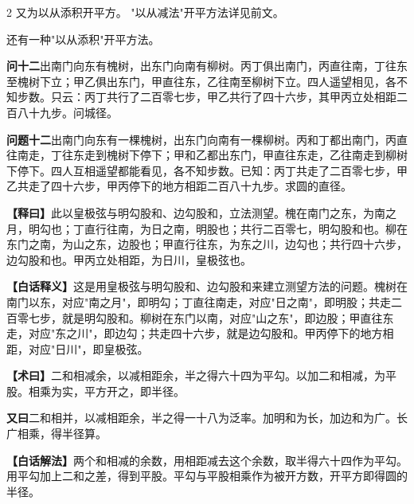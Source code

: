 \documentclass[11pt,a4paper]{article}
\newcommand{\WenQuestion}[1]{\textbf{\textcolor{classicalcolor}{#1}}}
\newcommand{\BaiQuestion}[1]{\textbf{\textcolor{moderncolor}{#1}}}
\newcommand{\WenExplain}{\textcolor{classicalcolor}{\textbf{【释曰】}}}
\newcommand{\BaiExplain}{\textcolor{moderncolor}{\textbf{【白话释义】}}}
\newcommand{\WenMethod}{\textcolor{classicalcolor}{\textbf{【术曰】}}}
\newcommand{\BaiMethod}{\textcolor{moderncolor}{\textbf{【白话解法】}}}
\begin{document}
\begin{paracol}{2}
又为以从添积开平方。
\switchcolumn
\small "以从减法"开平方法详见前文。

还有一种"以从添积"开平方法。

\vspace{0.8em}

\switchcolumn*
\begin{tcolorbox}[colback=red!3,colframe=red!30!black,boxrule=0.3pt]
\WenQuestion{问十二}\quad 出南门向东有槐树，出东门向南有柳树。丙丁俱出南门，丙直往南，丁往东至槐树下立；甲乙俱出东门，甲直往东，乙往南至柳树下立。四人遥望相见，各不知步数。只云：丙丁共行了二百零七步，甲乙共行了四十六步，其甲丙立处相距二百八十九步。问城径。
\end{tcolorbox}
\switchcolumn
\begin{tcolorbox}[colback=blue!3,colframe=blue!30!black,boxrule=0.3pt]
\BaiQuestion{问题十二}\quad 出南门向东有一棵槐树，出东门向南有一棵柳树。丙和丁都出南门，丙直往南走，丁往东走到槐树下停下；甲和乙都出东门，甲直往东走，乙往南走到柳树下停下。四人互相遥望都能看见，各不知步数。已知：丙丁共走了二百零七步，甲乙共走了四十六步，甲丙停下的地方相距二百八十九步。求圆的直径。
\end{tcolorbox}

\switchcolumn*
\begin{tcolorbox}[colback=red!5,colframe=red!30!black,boxrule=0.3pt]
\WenExplain\quad 此以皇极弦与明勾股和、边勾股和，立法测望。槐在南门之东，为南之月，明勾也；丁直行往南，为日之南，明股也；共行二百零七，明勾股和也。柳在东门之南，为山之东，边股也；甲直行往东，为东之川，边勾也；共行四十六步，边勾股和也。甲丙立处相距，为日川，皇极弦也。
\end{tcolorbox}
\switchcolumn
\begin{tcolorbox}[colback=blue!5,colframe=blue!30!black,boxrule=0.3pt]
\BaiExplain\quad 这是用皇极弦与明勾股和、边勾股和来建立测望方法的问题。槐树在南门以东，对应"南之月"，即明勾；丁直往南走，对应"日之南"，即明股；共走二百零七步，就是明勾股和。柳树在东门以南，对应"山之东"，即边股；甲直往东走，对应"东之川"，即边勾；共走四十六步，就是边勾股和。甲丙停下的地方相距，对应"日川"，即皇极弦。
\end{tcolorbox}

\switchcolumn*
\begin{tcolorbox}[colback=red!5,colframe=red!40!black,boxrule=0.3pt]
\WenMethod\quad 二和相减余，以减相距余，半之得六十四为平勾。以加二和相减，为平股。相乘为实，平方开之，即半径。

\vspace{0.3em}
\textbf{又曰}\quad 二和相并，以减相距余，半之得一十八为泛率。加明和为长，加边和为广。长广相乘，得半径算。
\end{tcolorbox}
\switchcolumn
\begin{tcolorbox}[colback=blue!5,colframe=blue!40!black,boxrule=0.3pt]
\BaiMethod\quad 两个和相减的余数，用相距减去这个余数，取半得六十四作为平勾。用平勾加上二和之差，得到平股。平勾与平股相乘作为被开方数，开平方即得圆的半径。


\end{tcolorbox}
\end{paracol}
\end{document}
